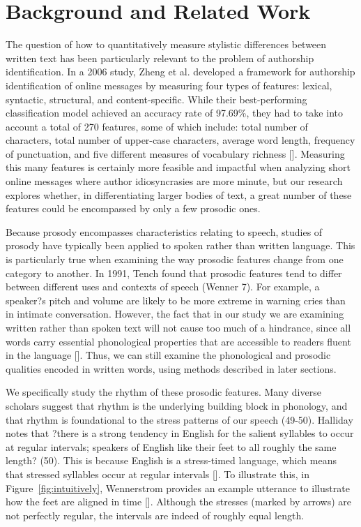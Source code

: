 \documentclass[pageno]{jpaper}
\begin{document}
\section{Background and Related Work}
The question of how to quantitatively measure stylistic differences between written text has been particularly relevant to the problem of authorship identification. In a 2006 study, Zheng et al. developed a framework for authorship identification of online messages by measuring four types of features: lexical, syntactic, structural, and content-specific. While their best-performing classification model achieved an accuracy rate of 97.69\%, they had to take into account a total of 270 features, some of which include: total number of characters, total number of upper-case characters, average word length, frequency of punctuation, and five different measures of vocabulary richness []. Measuring this many features is certainly more feasible and impactful when analyzing short online messages where author idiosyncrasies are more minute, but our research explores whether, in differentiating larger bodies of text, a great number of these features could be encompassed by only a few prosodic ones.

Because prosody encompasses characteristics relating to speech, studies of prosody have typically been applied to spoken rather than written language. This is particularly true when examining the way prosodic features change from one category to another. In 1991, Tench found that prosodic features tend to differ between different uses and contexts of speech (Wenner 7). For example, a speaker?s pitch and volume are likely to be more extreme in warning cries than in intimate conversation. However, the fact that in our study we are examining written rather than spoken text will not cause too much of a hindrance, since all words carry essential phonological properties that are accessible to readers fluent in the language []. Thus, we can still examine the phonological and prosodic qualities encoded in written words, using methods described in later sections.

We specifically study the rhythm of these prosodic features. Many diverse scholars suggest that rhythm is the underlying building block in phonology, and that rhythm is foundational to the stress patterns of our speech (49-50). Halliday notes that ?there is a strong tendency in English for the salient syllables to occur at regular intervals; speakers of English like their feet to all roughly the same length? (50). This is because English is a stress-timed language, which means that stressed syllables occur at regular intervals []. To illustrate this, in Figure~\ref{fig:intuitively}, Wennerstrom provides an example utterance to illustrate how the feet are aligned in time []. Although the stresses (marked by arrows) are not perfectly regular, the intervals are indeed of roughly equal length. 
\end{document}
